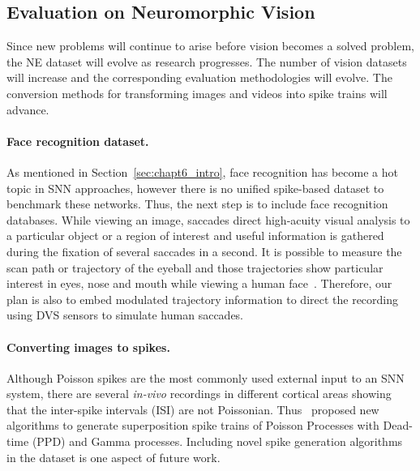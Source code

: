 \subsection{Evaluation on Neuromorphic Vision}
Since new problems will continue to arise before vision becomes a solved problem, the NE dataset will evolve as research progresses. 
The number of vision datasets will increase and the corresponding evaluation methodologies will evolve.
The conversion methods for transforming images and videos into spike trains will advance.

\paragraph{Face recognition dataset.}
As mentioned in Section~\ref{sec:chapt6_intro}, face recognition has become a hot topic in SNN approaches, however there is no unified spike-based dataset to benchmark these networks.
Thus, the next step is to include face recognition databases.
While viewing an image, saccades direct high-acuity visual analysis to a particular object or a region of interest and useful information is gathered during the fixation of several saccades in a second.
It is possible to measure the scan path or trajectory of the eyeball and those trajectories show particular interest in eyes, nose and mouth while viewing a human face~\citep{yarbus1967eye}.
Therefore, our plan is also to embed modulated trajectory information to direct the recording using DVS sensors to simulate human saccades.

\paragraph{Converting images to spikes.}
Although Poisson spikes are the most commonly used external input to an SNN system, there are several \textit{in-vivo} recordings in different cortical areas showing that the inter-spike intervals (ISI) are not Poissonian. 
Thus~\citet{deger2012statistical} proposed new algorithms to generate superposition spike trains of Poisson Processes with Dead-time (PPD) and Gamma processes.
Including novel spike generation algorithms in the dataset is one aspect of future work.

